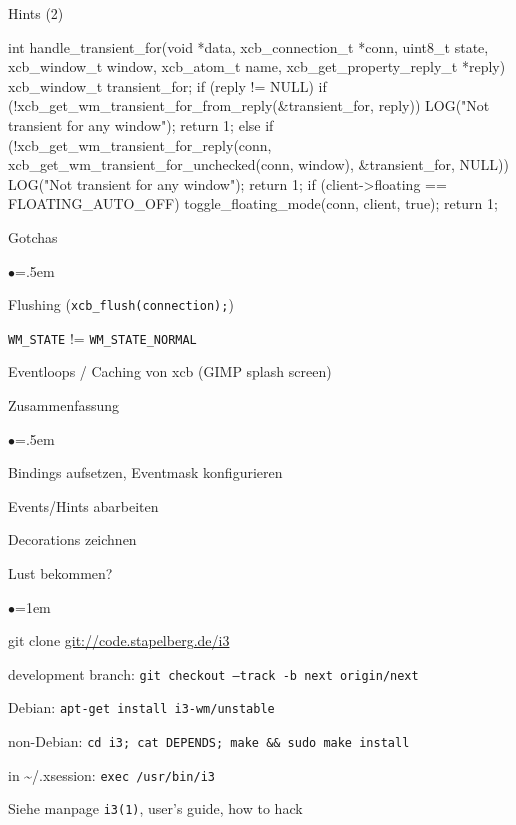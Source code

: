 \documentclass[mode=print,paper=screen,style=jefka]{powerdot}
\begin{document}
\begin{slide}[method=direct]{Hints (2)}
\begin{code}
int handle_transient_for(void *data, xcb_connection_t *conn,
           uint8_t state, xcb_window_t window,
           xcb_atom_t name, xcb_get_property_reply_t *reply)
{
  xcb_window_t transient_for;
  if (reply != NULL) {
    if (!xcb_get_wm_transient_for_from_reply(&transient_for, reply)) {
      LOG("Not transient for any window\n");
      return 1;
    }
  } else {
    if (!xcb_get_wm_transient_for_reply(conn,
        xcb_get_wm_transient_for_unchecked(conn, window),
        &transient_for, NULL)) {
      LOG("Not transient for any window\n");
      return 1;
    }
  }
  if (client->floating == FLOATING_AUTO_OFF)
    toggle_floating_mode(conn, client, true);
  return 1;
}
\end{code}
\end{slide}

\begin{slide}[method=direct]{Gotchas}
\begin{list}{$\bullet$}{\itemsep=.5em}
        \item Flushing (\texttt{xcb\_flush(connection);})
        \item \texttt{WM\_STATE} != \texttt{WM\_STATE\_NORMAL}
        \item Eventloops / Caching von xcb (GIMP splash screen)
\end{list}
\end{slide}


\begin{slide}{Zusammenfassung}
\begin{list}{$\bullet$}{\itemsep=.5em}
        \item Bindings aufsetzen, Eventmask konfigurieren
        \item Events/Hints abarbeiten
        \item Decorations zeichnen
\end{list}
\end{slide}

\begin{slide}{Lust bekommen?}
\begin{list}{$\bullet$}{\itemsep=1em}
        \item git clone \url{git://code.stapelberg.de/i3}
        \item development branch: \texttt{git checkout --track -b next origin/next}
        \item Debian: \texttt{apt-get install i3-wm/unstable}
        \item non-Debian: \texttt{cd i3; cat DEPENDS; make \&\& sudo make install}
        \item in \~{}/.xsession: \texttt{exec /usr/bin/i3}
        \item Siehe manpage \texttt{i3(1)}, user’s guide, how to hack
\end{list}
\end{slide}
\end{document}

